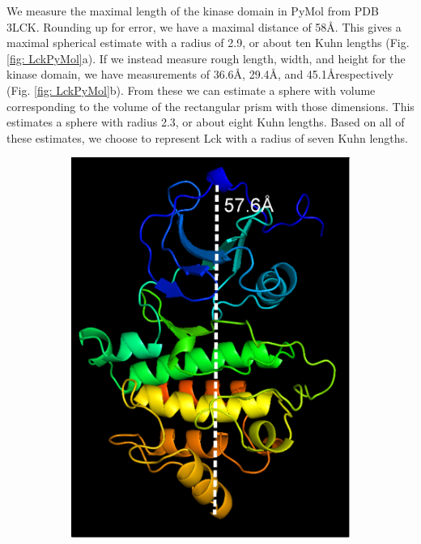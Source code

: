 \documentclass[../AdvancementSummary.tex]{subfiles}
\begin{document}
We measure the maximal length of the kinase domain in PyMol from PDB 3LCK. Rounding up for error, we have a maximal distance of 58\AA. This gives a maximal spherical estimate with a radius of 2.9\nm, or about ten Kuhn lengths (Fig. \ref{fig: LckPyMol}a). If we instead measure rough length, width, and height for the kinase domain, we have measurements of 36.6\AA, 29.4\AA, and 45.1\AA respectively (Fig. \ref{fig: LckPyMol}b). From these we can estimate a sphere with volume corresponding to the volume of the rectangular prism with those dimensions. This estimates a sphere with radius 2.3\nm, or about eight Kuhn lengths. Based on all of these estimates, we choose to represent Lck with a radius of seven Kuhn lengths.


\begin{figure}[H]
\begin{center}
\begin{subfigure}{0.4\linewidth}
\includegraphics[width=\linewidth]{LckPyMol/Diagonal.eps}

\end{subfigure}
\end{center}
\end{figure}
\end{document}
